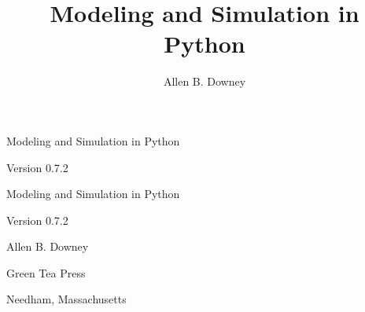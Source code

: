 \documentclass[12pt]{book}
\title{Modeling and Simulation in Python}
\author{Allen B. Downey}
\newcommand{\thetitle}{Modeling and Simulation in Python}
\newcommand{\theauthors}{Allen B. Downey}
\newcommand{\theversion}{0.7.2}
\theoremstyle{exercise}
\newif\ifplastex
\begin{document}
\frontmatter

\ifplastex

\maketitle

\else

\begin{latexonly}

\thispagestyle{empty}

\begin{flushright}
\vspace*{2.0in}

\begin{spacing}{3}
{\huge \thetitle}
\end{spacing}

\vspace{0.25in}

Version \theversion

\vfill

\end{flushright}


\newpage
\newpage

\pagebreak
\thispagestyle{empty}

\begin{flushright}
\vspace*{2.0in}

\begin{spacing}{3}
{\huge \thetitle}
\end{spacing}

\vspace{0.25in}

Version \theversion

\vspace{1in}


{\Large
\theauthors \\
}


\vspace{0.5in}

{\Large Green Tea Press}

{\small Needham, Massachusetts}

\vfill


\end{flushright}
\end{latexonly}
\end{document}
